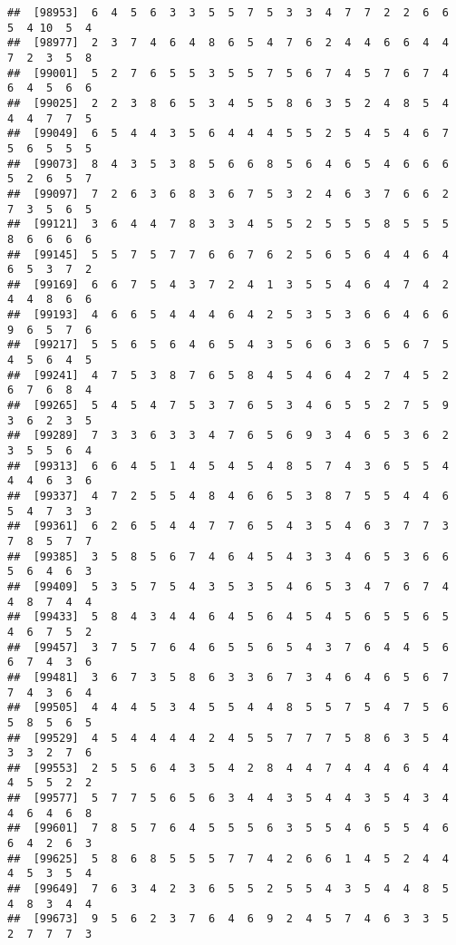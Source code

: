 \documentclass[
]{book}
\begin{document}
\begin{verbatim}
##  [98953]  6  4  5  6  3  3  5  5  7  5  3  3  4  7  7  2  2  6  6  5  4 10  5  4
##  [98977]  2  3  7  4  6  4  8  6  5  4  7  6  2  4  4  6  6  4  4  7  2  3  5  8
##  [99001]  5  2  7  6  5  5  3  5  5  7  5  6  7  4  5  7  6  7  4  6  4  5  6  6
##  [99025]  2  2  3  8  6  5  3  4  5  5  8  6  3  5  2  4  8  5  4  4  4  7  7  5
##  [99049]  6  5  4  4  3  5  6  4  4  4  5  5  2  5  4  5  4  6  7  5  6  5  5  5
##  [99073]  8  4  3  5  3  8  5  6  6  8  5  6  4  6  5  4  6  6  6  5  2  6  5  7
##  [99097]  7  2  6  3  6  8  3  6  7  5  3  2  4  6  3  7  6  6  2  7  3  5  6  5
##  [99121]  3  6  4  4  7  8  3  3  4  5  5  2  5  5  5  8  5  5  5  8  6  6  6  6
##  [99145]  5  5  7  5  7  7  6  6  7  6  2  5  6  5  6  4  4  6  4  6  5  3  7  2
##  [99169]  6  6  7  5  4  3  7  2  4  1  3  5  5  4  6  4  7  4  2  4  4  8  6  6
##  [99193]  4  6  6  5  4  4  4  6  4  2  5  3  5  3  6  6  4  6  6  9  6  5  7  6
##  [99217]  5  5  6  5  6  4  6  5  4  3  5  6  6  3  6  5  6  7  5  4  5  6  4  5
##  [99241]  4  7  5  3  8  7  6  5  8  4  5  4  6  4  2  7  4  5  2  6  7  6  8  4
##  [99265]  5  4  5  4  7  5  3  7  6  5  3  4  6  5  5  2  7  5  9  3  6  2  3  5
##  [99289]  7  3  3  6  3  3  4  7  6  5  6  9  3  4  6  5  3  6  2  3  5  5  6  4
##  [99313]  6  6  4  5  1  4  5  4  5  4  8  5  7  4  3  6  5  5  4  4  4  6  3  6
##  [99337]  4  7  2  5  5  4  8  4  6  6  5  3  8  7  5  5  4  4  6  5  4  7  3  3
##  [99361]  6  2  6  5  4  4  7  7  6  5  4  3  5  4  6  3  7  7  3  7  8  5  7  7
##  [99385]  3  5  8  5  6  7  4  6  4  5  4  3  3  4  6  5  3  6  6  5  6  4  6  3
##  [99409]  5  3  5  7  5  4  3  5  3  5  4  6  5  3  4  7  6  7  4  4  8  7  4  4
##  [99433]  5  8  4  3  4  4  6  4  5  6  4  5  4  5  6  5  5  6  5  4  6  7  5  2
##  [99457]  3  7  5  7  6  4  6  5  5  6  5  4  3  7  6  4  4  5  6  6  7  4  3  6
##  [99481]  3  6  7  3  5  8  6  3  3  6  7  3  4  6  4  6  5  6  7  7  4  3  6  4
##  [99505]  4  4  4  5  3  4  5  5  4  4  8  5  5  7  5  4  7  5  6  5  8  5  6  5
##  [99529]  4  5  4  4  4  4  2  4  5  5  7  7  7  5  8  6  3  5  4  3  3  2  7  6
##  [99553]  2  5  5  6  4  3  5  4  2  8  4  4  7  4  4  4  6  4  4  4  5  5  2  2
##  [99577]  5  7  7  5  6  5  6  3  4  4  3  5  4  4  3  5  4  3  4  4  6  4  6  8
##  [99601]  7  8  5  7  6  4  5  5  5  6  3  5  5  4  6  5  5  4  6  6  4  2  6  3
##  [99625]  5  8  6  8  5  5  5  7  7  4  2  6  6  1  4  5  2  4  4  4  5  3  5  4
##  [99649]  7  6  3  4  2  3  6  5  5  2  5  5  4  3  5  4  4  8  5  4  8  3  4  4
##  [99673]  9  5  6  2  3  7  6  4  6  9  2  4  5  7  4  6  3  3  5  2  7  7  7  3

\end{verbatim}
\end{document}
